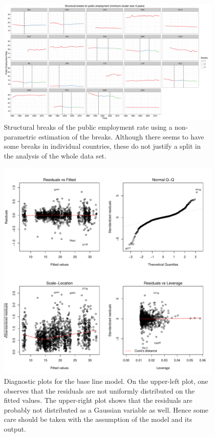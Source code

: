 \begin{landscape}
\begin{figure}[!ht] \centering
  \includegraphics[width=1.5\textwidth]{tex_output/egr_structural_breaks}
  \caption{Structural breaks of the public employment rate using a
    non-parametric estimation of the breaks. Although there seems to have some
    breaks in individual countries, these do not justify a split in the
    analysis of the whole data set.}
  \label{fig:strct:breaks}
\end{figure}
\end{landscape}


\begin{figure}[!ht]
  \label{fig:diag:lm} \centering
  \includegraphics[width=\textwidth]{tex_output/model_diagnostic_quarterly}
  \caption{Diagnostic plots for the base line model. On the upper-left plot,
    one observes that the residuals are not uniformly distributed on the fitted
    values. The upper-right plot shows that the residuals are probably not
    distributed as a Gaussian variable as well. Hence some care should be taken
    with the assumption of the model and its output.}
\end{figure}

